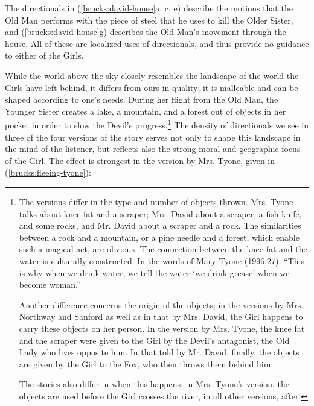 The directionals in (\ref{brucks:david-house}a, {c}, {e}) describe the motions that the Old Man performs with the piece of steel that he uses to kill the Older Sister, and (\ref{brucks:david-house}g) describes the Old Man's movement through the house. All of these are localized uses of directionals, and thus provide no guidance to either of the Girls.

While the world above the sky closely resembles the landscape of the world the Girls have left behind, it differs from ours in quality; it is malleable and can be shaped according to one's needs. During her flight from the Old Man, the Younger Sister creates a lake, a mountain, and a forest out of objects in her pocket in order to slow the Devil's progress.\footnote{The versions differ in the type and number of objects thrown. Mrs. Tyone talks about knee fat and a scraper; Mrs. David about a scraper, a fish knife, and some rocks, and Mr. David about a scraper and a rock. The similarities between a rock and a mountain, or a pine needle and a forest,  which enable such a magical act, are obvious. The connection between the knee fat and the water is culturally constructed. In the words of Mary Tyone (1996:27): ``This is why when we drink water, we tell the water `we drink grease' when we become woman.''

Another difference concerns the origin of the objects; in the versions by Mrs. Northway and Sanford as well as in that by Mrs. David, the Girl happens to carry these objects on her person. In the version by Mrs. Tyone, the knee fat and the scraper were given to the Girl by the Devil's antagonist, the Old Lady who lives opposite him. In that told by Mr. David, finally, the objects are given by the Girl to the Fox, who then throws them behind him.

The stories also differ in when this happens; in Mrs. Tyone's version, the objects are used before the Girl crosses the river, in all other versions, after.} The density of directionals we see in three of the four versions of the story serves not only to shape this landscape in the mind of the listener, but reflects also the strong moral and geographic focus of the Girl. The effect is strongest in the version by Mrs. Tyone, given in (\ref{brucks:fleeing-tyone}):

